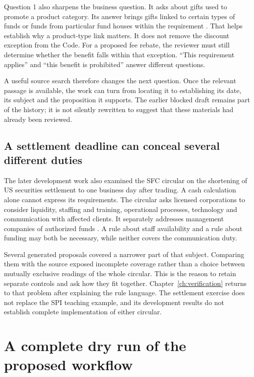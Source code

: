 Question 1 also sharpens the business question. It asks about gifts used to
promote a product category. Its answer brings gifts linked to certain types of
funds or funds from particular fund houses within the requirement
\citep[Question 1, answer and section reference]{sfcgiftfaq}. That helps establish
why a product-type link matters. It does not remove the discount exception from
the Code. For a proposed fee rebate, the reviewer must still determine whether
the benefit falls within that exception. ``This requirement applies'' and
``this benefit is prohibited'' answer different questions.

A useful source search therefore changes the next question. Once the relevant
passage is available, the work can turn from locating it to establishing its
date, its subject and the proposition it supports. The earlier blocked draft
remains part of the history; it is not silently rewritten to suggest that these
materials had already been reviewed.

\subsection{A settlement deadline can conceal several different duties}
\label{sec:settlement-readiness}

The later development work also examined the SFC circular on the shortening of
US securities settlement to one business day after trading. A cash calculation
alone cannot express its requirements. The circular asks licensed corporations
to consider liquidity, staffing and training, operational processes, technology
and communication with affected clients. It separately addresses management
companies of authorized funds \citep{sfctplusone2024}. A rule about staff
availability and a rule about funding may both be necessary, while neither
covers the communication duty.

Several generated proposals covered a narrower part of that subject. Comparing
them with the source exposed incomplete coverage rather than a choice between
mutually exclusive readings of the whole circular. This is the reason to retain
separate controls and ask how they fit together. Chapter~\ref{ch:verification}
returns to that problem after explaining the rule language. The settlement
exercise does not replace the SPI teaching example, and its development results
do not establish complete implementation of either circular.

\section{A complete dry run of the proposed workflow}
\label{merge:M02:07}

